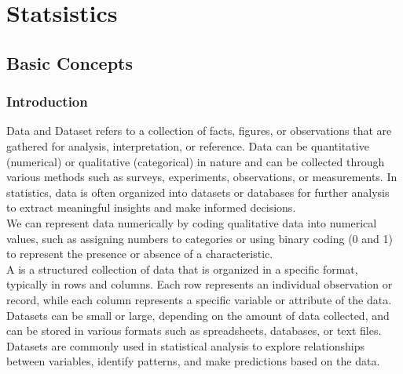 \documentclass[openany]{book}
\begin{document}
\part{Statsistics}
\chapter{Basic Concepts}
\section{Introduction}
\begin{mydefinition}{Data and Dataset}
     refers to a collection of facts, figures, or observations that are gathered for analysis, interpretation, or reference. Data can be quantitative (numerical) or qualitative (categorical) in nature and can be collected through various methods such as surveys, experiments, observations, or measurements. In statistics, data is often organized into datasets or databases for further analysis to extract meaningful insights and make informed decisions. \\
    We can represent data numerically by coding qualitative data into numerical values, such as assigning numbers to categories or using binary coding (0 and 1) to represent the presence or absence of a characteristic. \\
    A  is a structured collection of data that is organized in a specific format, typically in rows and columns. Each row represents an individual observation or record, while each column represents a specific variable or attribute of the data. Datasets can be small or large, depending on the amount of data collected, and can be stored in various formats such as spreadsheets, databases, or text files. Datasets are commonly used in statistical analysis to explore relationships between variables, identify patterns, and make predictions based on the data.
\end{mydefinition}
\end{document}
